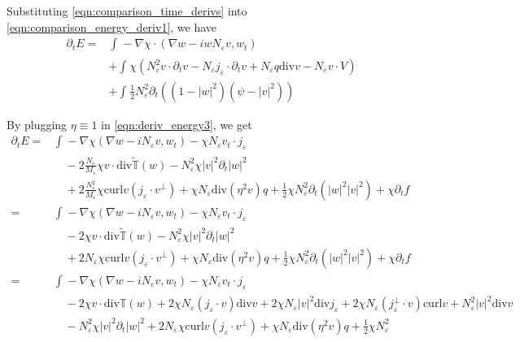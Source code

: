 \documentclass[a4paper]{article}
\newcommand{\curl}{\mathrm{curl}}
\renewcommand{\div}{\mathrm{div}}
\begin{document}
Substituting \eqref{eqn:comparison_time_derivs} into \eqref{eqn:comparison_energy_deriv1}, we have
\begin{align}
  \partial_t E = &\int_{}^{} - \nabla \chi \cdot ( \nabla w - i w N_\varepsilon v, w_t) \nonumber \\
  &+ \int_{}^{} \chi (N_\varepsilon^2 v \cdot \partial_t v - N_\varepsilon j_\varepsilon \cdot \partial_t v + N_\varepsilon q \div v - N_\varepsilon v
  \cdot V ) \nonumber \\
  &+ \int_{}^{} \frac{1}{2} N_\varepsilon^2 \partial_t ( (1-|w|^2)(\psi - |v|^2) )
  \label{eqn:comparison_energy_deriv2}
\end{align}

By plugging $\eta \equiv 1$ in \eqref{eqn:deriv_energy3}, we get
\begin{align}
  \partial_t E = & \int_{}^{} -\nabla \chi ( \nabla w - i N_\varepsilon v, w_t) - \chi N_\varepsilon v_t \cdot j_\varepsilon \nonumber \\
  &\quad - 2 \frac{N_\varepsilon}{M_\varepsilon} \chi v \cdot \div \tilde{\mathbb{T}} (w) - N_\varepsilon^2 \chi |v|^2 \partial_t |w|^2 \nonumber \\
  &\quad + 2 \frac{N_\varepsilon^2}{M_\varepsilon} \chi \curl v (j_\varepsilon \cdot v^\perp) + \chi N_\varepsilon \div(\eta^2 v )q + \frac{1}{2} \chi N_\varepsilon^2 \partial_t( |w|^2
  |v|^2) + \chi \partial_t f \nonumber \\
  = &\int_{}^{} -\nabla \chi ( \nabla w - i N_\varepsilon v, w_t ) - \chi N_\varepsilon v_t \cdot j_\varepsilon \nonumber \\
  &\quad - 2 \chi v \cdot \div \tilde{\mathbb{T}}(w) - N_\varepsilon^2 \chi |v|^2 \partial_t |w|^2 \nonumber \\
  &\quad + 2 N_\varepsilon \chi \curl v ( j_\varepsilon \cdot v^\perp) + \chi N_\varepsilon \div(\eta^2 v )q + \frac{1}{2} \chi N_\varepsilon^2 \partial_t( |w|^2 |v|^2 ) + \chi \partial_t f
  \nonumber \\
  = &\int_{}^{} -\nabla \chi (\nabla w - i N_\varepsilon v, w_t) - \chi N_\varepsilon v_t \cdot j_\varepsilon \nonumber \\
  &\quad - 2 \chi v \cdot \div \mathbb{T} (w) + 2 \chi N_\varepsilon (j_\varepsilon \cdot v) \div v + 2 \chi N_\varepsilon |v|^2 \div j_\varepsilon +
  2 \chi N_\varepsilon (j_\varepsilon^\perp \cdot v) \curl v + N_\varepsilon^2 |v|^2 \div v \nonumber \\
  &\quad - N_\varepsilon^2 \chi |v|^2 \partial_t |w|^2 + 2 N_\varepsilon \chi \curl v (j_\varepsilon \cdot v^\perp) + \chi N_\varepsilon \div(\eta^2 v )q + \frac{1}{2} \chi N_\varepsilon^2

\end{align}
\end{document}

